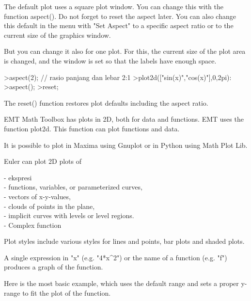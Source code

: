\documentclass[a4paper,10pt]{article}
\begin{document}
\begin{eulernotebook}
\begin{eulercomment}
\end{eulercomment}
\begin{eulercomment}
The default plot uses a square plot window. You can change this with the function
aspect(). Do not forget to reset the aspect later. You can also change this default in
the menu with "Set Aspect" to a specific aspect ratio or to the current size of the
graphics window.

But you can change it also for one plot. For this, the current size of the plot area is
changed, and the window is set so that the labels have enough space.
\end{eulercomment}
\begin{eulerprompt}
>aspect(2); // rasio panjang dan lebar 2:1
>plot2d(["sin(x)","cos(x)"],0,2pi):
>aspect();
>reset;
\end{eulerprompt}
\begin{eulercomment}
The reset() function restores plot defaults including the aspect ratio.\\
\begin{eulercomment}
\begin{eulercomment}
EMT Math Toolbox has plots in 2D, both for data and functions. EMT uses the function
plot2d. This function can plot functions and data.

It is possible to plot in Maxima using Gnuplot or in Python using Math Plot Lib.

Euler can plot 2D plots of

- ekspresi\\
- functions, variables, or parameterized curves,\\
- vectors of x-y-values,\\
- clouds of points in the plane,\\
- implicit curves with levels or level regions.\\
- Complex function

Plot styles include various styles for lines and points, bar plots and shaded plots.\\
\begin{eulercomment}
\begin{eulercomment}
A single expression in "x" (e.g. "4*x\textasciicircum{}2") or the name of a function (e.g. "f") produces
a graph of the function.

Here is the most basic example, which uses the default range and sets a proper y-range
to fit the plot of the function.


\end{eulercomment}
\end{eulercomment}
\end{eulercomment}
\end{eulercomment}
\end{eulercomment}
\end{eulernotebook}
\end{document}
